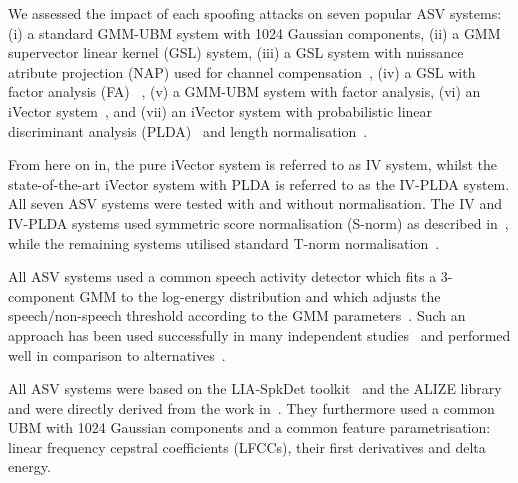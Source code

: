 
We assessed the impact of each spoofing attacks on seven popular ASV systems: (i) a standard GMM-UBM system with 1024 Gaussian components, (ii) a GMM supervector linear kernel (GSL) system, (iii) a GSL system with nuissance atribute projection (NAP) used for channel compensation~\cite{Campbell2006}, (iv) a GSL with factor analysis (FA) ~\cite{Fauve2007}, (v) a GMM-UBM system with factor analysis, (vi) an iVector system~\cite{Dehak2011}, and (vii) an iVector system  with probabilistic linear discriminant analysis (PLDA)~\cite{Li2012} and length normalisation~\cite{Garcia2011}.  

From here on in, the pure iVector system is referred to as IV system, whilst the state-of-the-art iVector system with PLDA is referred to as the IV-PLDA system. All seven ASV systems were tested with and without normalisation. The IV and IV-PLDA systems used symmetric score normalisation (S-norm) as described in~\cite{Kenny2010}, while the remaining systems utilised standard T-norm normalisation~\cite{Auckenthaler2000}.

All ASV systems used a common speech activity detector which fits a 3-component GMM to the log-energy distribution and which adjusts the speech/non-speech threshold according to the GMM parameters~\cite{Bimbot2004}.  Such an approach has been used successfully in many independent studies~\cite{magrin2001,fauve2008} and performed well in comparison to alternatives~\cite{sahidullah2012}. 

All ASV systems were based on the LIA-SpkDet toolkit~\cite{Bonastre2008} and the ALIZE library~\cite{Bonastre2004} and were directly derived from the work in~\cite{Fauve2007}.  They furthermore used a common UBM with 1024 Gaussian components and a common feature parametrisation: linear frequency cepstral coefficients (LFCCs), their first derivatives and delta energy.  






